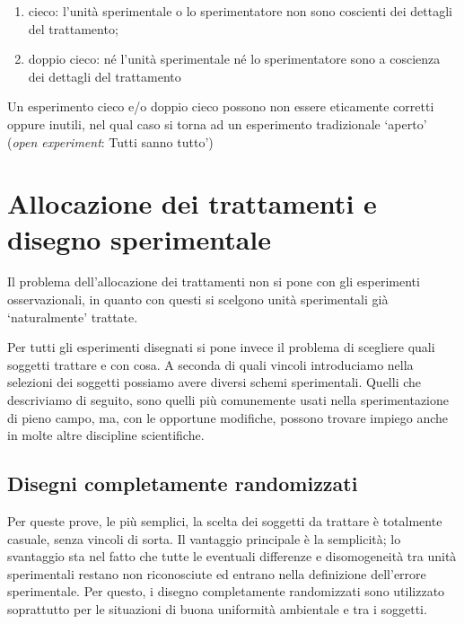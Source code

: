 \documentclass[a4paper,12pt,oneside]{book}
\providecommand{\tightlist}{%
  \setlength{\itemsep}{0pt}\setlength{\parskip}{0pt}}
\begin{document}
\begin{enumerate}
\def\labelenumi{\arabic{enumi}.}
\tightlist
\item
  cieco: l'unità sperimentale o lo sperimentatore non sono coscienti dei dettagli del trattamento;
\item
  doppio cieco: né l'unità sperimentale né lo sperimentatore sono a coscienza dei dettagli del trattamento
\end{enumerate}

Un esperimento cieco e/o doppio cieco possono non essere eticamente corretti oppure inutili, nel qual caso si torna ad un esperimento tradizionale `aperto' (\emph{open experiment}: Tutti sanno tutto')

\hypertarget{allocazione-dei-trattamenti-e-disegno-sperimentale}{%
\section{Allocazione dei trattamenti e disegno sperimentale}\label{allocazione-dei-trattamenti-e-disegno-sperimentale}}

Il problema dell'allocazione dei trattamenti non si pone con gli esperimenti osservazionali, in quanto con questi si scelgono unità sperimentali già `naturalmente' trattate.

Per tutti gli esperimenti disegnati si pone invece il problema di scegliere quali soggetti trattare e con cosa. A seconda di quali vincoli introduciamo nella selezioni dei soggetti possiamo avere diversi schemi sperimentali. Quelli che descriviamo di seguito, sono quelli più comunemente usati nella sperimentazione di pieno campo, ma, con le opportune modifiche, possono trovare impiego anche in molte altre discipline scientifiche.

\hypertarget{disegni-completamente-randomizzati}{%
\subsection{Disegni completamente randomizzati}\label{disegni-completamente-randomizzati}}

Per queste prove, le più semplici, la scelta dei soggetti da trattare è totalmente casuale, senza vincoli di sorta. Il vantaggio principale è la semplicità; lo svantaggio sta nel fatto che tutte le eventuali differenze e disomogeneità tra unità sperimentali restano non riconosciute ed entrano nella definizione dell'errore sperimentale. Per questo, i disegno completamente randomizzati sono utilizzato soprattutto per le situazioni di buona uniformità ambientale e tra i soggetti.
\end{document}
